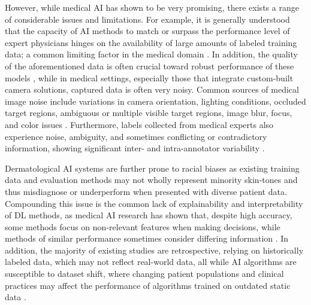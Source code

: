 \documentclass[11pt]{ucthesis}
\begin{document}
However, while medical AI has shown to be very promising, there exists a range of considerable issues and limitations. For example, it is generally understood that the capacity of AI methods to match or surpass the performance level of expert physicians hinges on the availability of large amounts of labeled training data; a common limiting factor in the medical domain \cite{Esteva2021DeepLM}. In addition, the quality of the aforementioned data is often crucial toward robust performance of these models \cite{Gupta2019DealingWN, Nazar2017DeepCN}, while in medical settings, especially those that integrate custom-built camera solutions, captured data is often very noisy. Common sources of medical image noise include variations in camera orientation, lighting conditions, occluded target regions, ambiguous or multiple visible target regions, image blur, focus, and color issues \cite{carrion2021automatic, Carrin2022HealNet}. Furthermore, labels collected from medical experts also experience noise, ambiguity, and sometimes conflicting or contradictory information, showing significant inter- and intra-annotator variability \cite{carrion2021automatic, Mirikharaji2020DLEMADL}.

Dermatological AI systems are further prone to racial biases \cite{Carrion2023FEDDF, Delpino2022MachineLF, Myszczynska2020ApplicationsOM, Hussain2022ModernDI} as existing training data and evaluation methods may not wholly represent minority skin-tones and thus misdiagnose or underperform when presented with diverse patient data. Compounding this issue is the common lack of explainability and interpretability of DL methods, as medical AI research has shown that, despite high accuracy, some methods focus on non-relevant features when making decisions, while methods of similar performance sometimes consider differing information \cite{Young2019DeepNN}. In addition, the majority of existing studies are retrospective, relying on historically labeled data, which may not reflect real-world data, all while AI algorithms are susceptible to dataset shift, where changing patient populations and clinical practices may affect the performance of algorithms trained on outdated static data \cite{Kelly2019KeyCF}.
\end{document}
